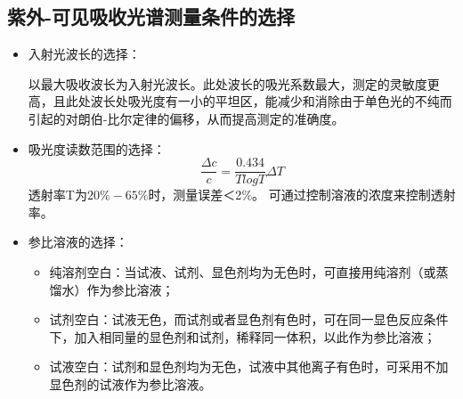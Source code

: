 \subsection{紫外-可见吸收光谱测量条件的选择}
\begin{itemize}
    \item 入射光波长的选择：
    
    以最大吸收波长为入射光波长。此处波长的吸光系数最大，测定的灵敏度更高，且此处波长处吸光度有一小的平坦区，能减少和消除由于单色光的不纯而引起的对朗伯-比尔定律的偏移，从而提高测定的准确度。
    
    \item 吸光度读数范围的选择：
    \begin{equation*}
        \frac{\Delta c}{c}=\frac{0.434}{T log T}\Delta T
    \end{equation*}
    透射率T为$20\%-65\%$时，测量误差＜2$\%$。
    可通过控制溶液的浓度来控制透射率。
    
    \item 参比溶液的选择：
     \begin{itemize}
        \item 纯溶剂空白：当试液、试剂、显色剂均为无色时，可直接用纯溶剂（或蒸 馏水）作为参比溶液；
        \item  试剂空白：试液无色，而试剂或者显色剂有色时，可在同一显色反应条件下，加入相同量的显色剂和试剂，稀释同一体积，以此作为参比溶液；
        \item  试液空白：试剂和显色剂均为无色，试液中其他离子有色时，可采用不加显色剂的试液作为参比溶液。
    \end{itemize}

\end{itemize}    